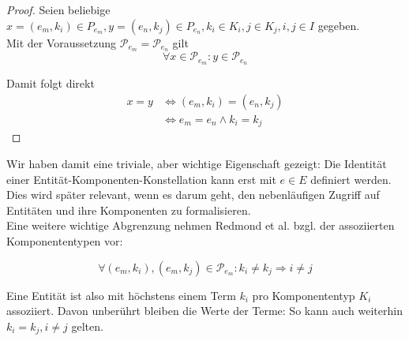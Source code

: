 \begin{proof}
    Seien beliebige $x = (e_m, k_{i}) \in P_{e_m}, y = (e_n, k_j) \in P_{e_n}, k_i \in K_i, j \in K_j, i, j \in I$ gegeben.\\

    \noindent
    Mit der Voraussetzung $\mathcal{P}_{e_m} = \mathcal{P}_{e_n}$ gilt
    \[
        \forall x \in \mathcal{P}_{e_m} : y \in \mathcal{P}_{e_n}
    \]

    \noindent
    Damit folgt direkt
    \[
        \begin{alignat}{3}
            x = y &\Leftrightarrow (e_m, k_i) = (e_n, k_j) \\
            &\Leftrightarrow e_m = e_n \land k_i = k_j
        \end{alignat}
    \]
\end{proof}
\bigskip

\noindent
Wir haben damit eine triviale, aber wichtige Eigenschaft gezeigt: Die Identität einer Entität-Komponenten-Konstellation kann erst mit $e \in E$ definiert werden.
Dies wird später relevant, wenn es darum geht, den nebenläufigen Zugriff auf Entitäten und ihre Komponenten zu formalisieren.\\

Eine weitere wichtige Abgrenzung nehmen Redmond et al. bzgl. der assoziierten Komponententypen vor:

\[
    \forall (e_m, k_i), (e_m, k_j) \in \mathcal{P}_{e_m} : k_i \neq k_j \Rightarrow i \neq j
\]

\noindent
Eine Entität ist also mit höchstens einem Term $k_i$ pro Komponententyp $K_i$ assoziiert.
Davon unberührt bleiben die Werte der Terme: So kann auch weiterhin $k_i = k_j, i \neq j$ gelten.

